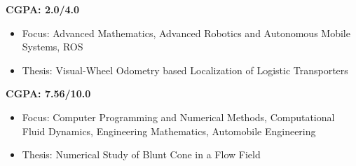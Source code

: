 \documentclass[11pt,a4paper,roman]{moderncv} %
\begin{document}
\vspace{10pt}

{
\textbf{CGPA: 2.0/4.0}
\vspace{5pt}
\begin{itemize}
\item Focus: Advanced Mathematics, Advanced Robotics and Autonomous Mobile Systems, ROS
\item Thesis: Visual-Wheel Odometry based Localization of Logistic Transporters
\end{itemize}
}

\vspace{10pt}

{
\textbf{CGPA: 7.56/10.0}
\vspace{5pt}
\begin{itemize}
\item Focus: Computer Programming and Numerical Methods, Computational Fluid Dynamics, Engineering Mathematics, Automobile Engineering
\item Thesis: Numerical Study of Blunt Cone in a Flow Field
\end{itemize}
}



\end{document}
